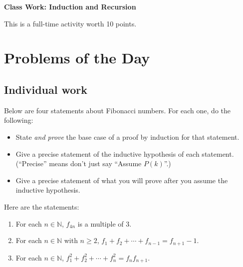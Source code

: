 \documentclass[11pt]{article}
\begin{document}
	
	\thispagestyle{empty}
	\renewcommand{\headrulewidth}{0.0pt}
	\thispagestyle{fancy}
	\lfoot{}
	\cfoot{}
	\rfoot{}	
	
	\vspace*{0in}

		\begin{center}
			\begin{large}
			\textbf{Class Work: Induction and Recursion} \\
			\end{large}
			This is a full-time activity worth 10 points. 
			
		\end{center}
		

\section*{Problems of the Day}

\subsection*{Individual work}

Below are four statements about Fibonacci numbers. For each one, do the following: 
\begin{itemize}
	\item State \emph{and prove} the base case of a proof by induction for that statement.
	\item Give a precise statement of the inductive hypothesis of each statement. (``Precise'' means don't just say ``Assume $P(k)$''.)
	\item Give a precise statement of what you will prove after you assume the inductive hypothesis. 
\end{itemize}

Here are the statements: 
\begin{enumerate}
	\item For each $n \in \mathbb{N}$, $f_{4n}$ is a multiple of $3$. 
	\item For each $n \in \mathbb{N}$ with $n \geq 2$, $f_1 + f_2 + \cdots + f_{n-1} = f_{n+1} - 1$. 
	\item For each $n \in \mathbb{N}$, $f_1^2 + f_2^2 + \cdots + f_n^2 = f_n f_{n+1}$. 
\end{enumerate}
\end{document}
